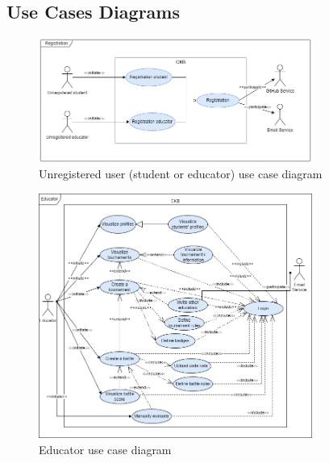 \subsection{Use Cases Diagrams}
\begin{figure}[H]
    \centering
    \includegraphics[width=0.8\textwidth]{images/use_cases_diagrams/registration_functions.png}
    \caption{Unregistered user (student or educator) use case diagram}
\end{figure}

\begin{figure}[H]
    \centering
    \includegraphics[width=0.8\textwidth]{images/use_cases_diagrams/educators_functions.png}
    \caption{Educator use case diagram}
\end{figure}

